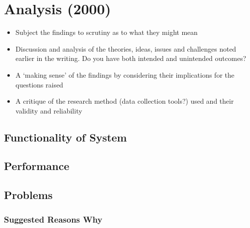 \chapter{Analysis (2000)}
\begin{itemize}
	\item Subject the findings to scrutiny as to what they might mean
	\item Discussion and analysis of the theories, ideas, issues and challenges noted earlier in the writing. Do you have both intended and unintended outcomes?
	\item A `making sense' of the findings by considering their implications for the questions raised
	\item A critique of the research method (data collection tools?) used and their validity and reliability
\end{itemize}
\section{Functionality of System}
\section{Performance}
\section{Problems}
\subsection{Suggested Reasons Why}
